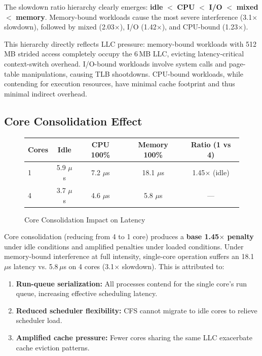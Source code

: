 \documentclass[conference]{IEEEtran}
\begin{document}
The slowdown ratio hierarchy clearly emerges: \textbf{idle} $<$ \textbf{CPU}
$<$ \textbf{I/O} $<$ \textbf{mixed} $<$ \textbf{memory}. Memory-bound workloads
cause the most severe interference (3.1$\times$ slowdown), followed by mixed
(2.03$\times$), I/O (1.42$\times$), and CPU-bound (1.23$\times$).

This hierarchy directly reflects LLC pressure: memory-bound workloads with
512\,MB strided access completely occupy the 6\,MB LLC, evicting latency-critical
context-switch overhead. I/O-bound workloads involve system calls and page-table
manipulations, causing TLB shootdowns. CPU-bound workloads, while contending
for execution resources, have minimal cache footprint and thus minimal indirect
overhead.

\subsection{Core Consolidation Effect}

\begin{figure}[h]
\centering
\begin{tabular}{lcccc}
\toprule
\textbf{Cores} & \textbf{Idle} & \textbf{CPU 100\%} & \textbf{Memory 100\%} &
\textbf{Ratio (1 vs 4)} \\
\midrule
1   & 5.9 $\mu$s & 7.2 $\mu$s & 18.1 $\mu$s & 1.45$\times$ (idle) \\
4   & 3.7 $\mu$s & 4.6 $\mu$s &  5.8 $\mu$s & --- \\
\bottomrule
\end{tabular}
\caption{Core Consolidation Impact on Latency}
\label{tab:core_consolidation}
\end{figure}

Core consolidation (reducing from 4 to 1 core) produces a \textbf{base 1.45$\times$
penalty} under idle conditions and amplified penalties under loaded conditions.
Under memory-bound interference at full intensity, single-core operation suffers
an 18.1\,$\mu$s latency vs. 5.8\,$\mu$s on 4 cores (3.1$\times$ slowdown).
This is attributed to:
\begin{enumerate}
  \item \textbf{Run-queue serialization:} All processes contend for the single
        core's run queue, increasing effective scheduling latency.
  \item \textbf{Reduced scheduler flexibility:} CFS cannot migrate to idle
        cores to relieve scheduler load.
  \item \textbf{Amplified cache pressure:} Fewer cores sharing the same LLC
        exacerbate cache eviction patterns.
\end{enumerate}
\end{document}
